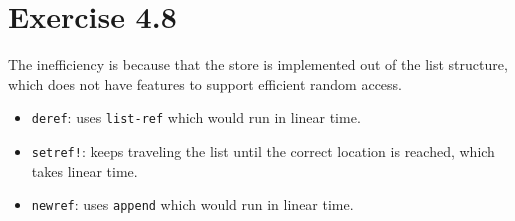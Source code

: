 \section*{Exercise 4.8}

The inefficiency is because that the store is implemented
out of the list structure, which does not have features to
support efficient random access.

\begin{itemize}
    \item \texttt{deref}: uses \texttt{list-ref} which would run in linear time.
    \item \texttt{setref!}: keeps traveling the list until the correct location
            is reached, which takes linear time.
    \item \texttt{newref}: uses \texttt{append} which would run in linear time.
\end{itemize}
